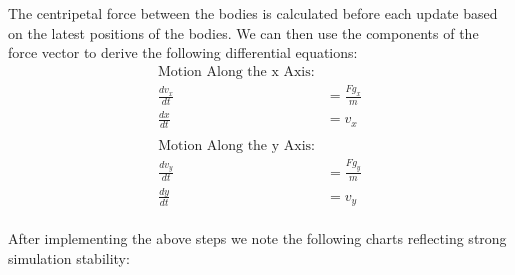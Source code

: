 \documentclass[a4paper,12pt]{article}
\begin{document}
The centripetal force between the bodies is calculated before each update based on the
latest positions of the bodies. We can then use the components of the force vector to
derive the following differential equations:
\begin{align*}
    \text{Motion Along the x Axis:}\\
    \frac{dv_x}{dt} &= \frac{Fg_x}{m}\\
    \frac{dx}{dt}   &= v_x\\
\end{align*}
\begin{align*}
    \text{Motion Along the y Axis:}\\
    \frac{dv_y}{dt} &= \frac{Fg_y}{m}\\
    \frac{dy}{dt}   &= v_y\\
\end{align*}

After implementing the above steps we note the following charts reflecting strong
simulation stability:
\end{document}
